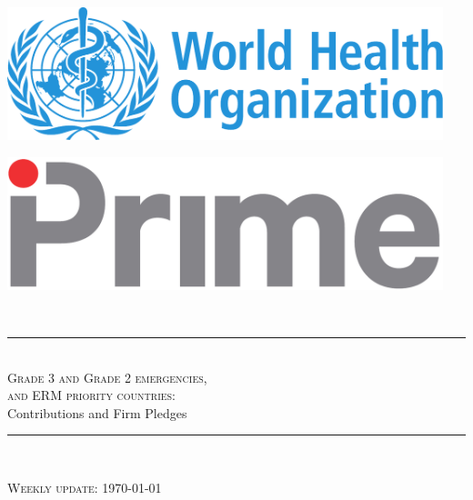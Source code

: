 \documentclass[12pt,a4paper]{article}\usepackage[]{graphicx}\usepackage[]{color}
\newcommand{\HRule}{\rule{\linewidth}{0.5mm}}
\begin{document}
\begin{titlepage}
\begin{center}

\begin{minipage}{0.45\textwidth}
\begin{flushleft}\large
\includegraphics[width=0.95\textwidth]{./logo_who}~\\[1cm]
\end{flushleft}
\end{minipage}
\hfill
\begin{minipage}{0.45\textwidth}
\begin{flushright}\large
\includegraphics[width=0.95\textwidth]{./logo_prime}~\\[1cm]
\end{flushright}
\end{minipage}\\[4.0cm]

\HRule \\[0.3cm]
\textsc{\huge Grade 3 and Grade 2 emergencies,}\\[0.4cm]
\textsc{\huge and ERM priority countries:}\\[0.9cm]
{\LARGE Contributions and Firm Pledges}\\[0.2cm]
\HRule\\[1.5cm]
\vfill

\cleanlookdateon
\textsc{\LARGE Weekly update: \today}%

\end{center}
\end{titlepage}
\end{document}
